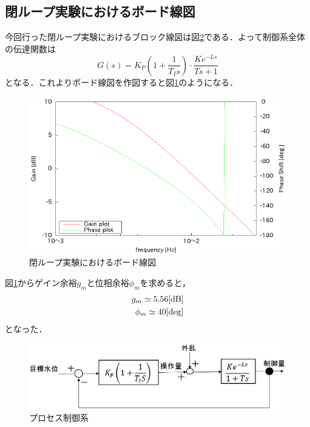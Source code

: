 \documentclass[11pt,a4paper]{jsarticle}
\begin{document}
  \subsection{閉ループ実験におけるボード線図}
  今回行った閉ループ実験におけるブロック線図は図\ref{fig11}である．よって制御系全体の伝達関数は
  \begin{equation}
   G(s) = K_P(1 + \frac{1}{T_I s}) \cdot \frac{K e^{-Ls}}{Ts + 1}
  \end{equation}
  となる．これよりボード線図を作図すると図\ref{fig12}のようになる．

  \begin{figure}
   \begin{center}
    \includegraphics[scale=.7] {./picture/bode3.eps}
    \caption{閉ループ実験におけるボード線図}
    \label{fig12}
   \end{center}
  \end{figure}

  図\ref{fig12}からゲイン余裕$g_m$と位相余裕$\phi_m$を求めると，
  \begin{eqnarray*}
   g_m \simeq 5.56[\rm{dB}] \\
   \phi_m \simeq 40[\rm{deg}]
  \end{eqnarray*}
  となった．
  \begin{figure}
   \begin{center}
    \includegraphics[scale=.7] {./picture/blocks_exp4.eps}
    \caption{プロセス制御系}
    \label{fig11}
   \end{center}
  \end{figure}
\end{document}
